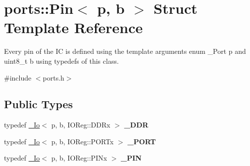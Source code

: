 \hypertarget{structports_1_1Pin}{}\section{ports\+:\+:Pin$<$ p, b $>$ Struct Template Reference}
\label{structports_1_1Pin}


Every pin of the IC is defined using the template arguments {\ttfamily enum \+\_\+\+Port p} and {\ttfamily uint8\+\_\+t b} using {\ttfamily typedef}s of this class.  




{\ttfamily \#include $<$ports.\+h$>$}

\subsection*{Public Types}
\begin{DoxyCompactItemize}
\item 
\hypertarget{structports_1_1Pin_a5d991a9ebbf61a7e1e8f79a4bae99682}{}\label{structports_1_1Pin_a5d991a9ebbf61a7e1e8f79a4bae99682} 
typedef \hyperlink{structports_1_1__Io}{\+\_\+\+Io}$<$ p, b, I\+O\+Reg\+::\+D\+D\+Rx $>$ {\bfseries \+\_\+\+D\+DR}
\item 
\hypertarget{structports_1_1Pin_a4da57c84dd4c80bafaf4db38326b3400}{}\label{structports_1_1Pin_a4da57c84dd4c80bafaf4db38326b3400} 
typedef \hyperlink{structports_1_1__Io}{\+\_\+\+Io}$<$ p, b, I\+O\+Reg\+::\+P\+O\+R\+Tx $>$ {\bfseries \+\_\+\+P\+O\+RT}
\item 
\hypertarget{structports_1_1Pin_ad0fcc2d4bf1f59aed3a25bd63314aea0}{}\label{structports_1_1Pin_ad0fcc2d4bf1f59aed3a25bd63314aea0} 
typedef \hyperlink{structports_1_1__Io}{\+\_\+\+Io}$<$ p, b, I\+O\+Reg\+::\+P\+I\+Nx $>$ {\bfseries \+\_\+\+P\+IN}
\end{DoxyCompactItemize}
